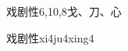 \begin{entry}{戏剧性}{6,10,8}{⼽、⼑、⼼}
  \begin{phonetics}{戏剧性}{xi4ju4xing4}
  \end{phonetics}
\end{entry}
